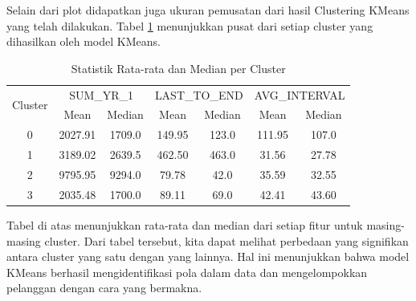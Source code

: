 Selain dari plot didapatkan juga ukuran pemusatan dari hasil Clustering KMeans yang telah dilakukan. Tabel \ref{tab:cluster_summary} menunjukkan pusat dari setiap cluster yang dihasilkan oleh model KMeans.


\begin{table}[H]
    \centering
    \caption{Statistik Rata-rata dan Median per Cluster}
    \label{tab:cluster_summary}
    \begin{tabular}{|c|c|c|c|c|c|c|}
        \hline
        \multirow{2}{*}{Cluster} & \multicolumn{2}{c|}{SUM\_YR\_1} & \multicolumn{2}{c|}{LAST\_TO\_END} & \multicolumn{2}{c|}{AVG\_INTERVAL} \\
        \cline{2-7}
         & Mean & Median & Mean & Median & Mean & Median \\
        \hline
        0 & 2027.91 & 1709.0 & 149.95 & 123.0 & 111.95 & 107.0 \\
        1 & 3189.02 & 2639.5 & 462.50 & 463.0 & 31.56  & 27.78 \\
        2 & 9795.95 & 9294.0 & 79.78  & 42.0  & 35.59  & 32.55 \\
        3 & 2035.48 & 1700.0 & 89.11  & 69.0  & 42.41  & 43.60 \\
        \hline
    \end{tabular}
\end{table}

Tabel di atas menunjukkan rata-rata dan median dari setiap fitur untuk masing-masing cluster. Dari tabel tersebut, kita dapat melihat perbedaan yang signifikan antara cluster yang satu dengan yang lainnya. Hal ini menunjukkan bahwa model KMeans berhasil mengidentifikasi pola dalam data dan mengelompokkan pelanggan dengan cara yang bermakna.

